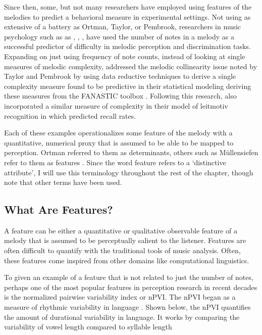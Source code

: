 \documentclass[]{book}
\begin{document}
Since then, some, but not many researchers have employed using features of the melodies to predict a behavioral measure in experimental settings.
Not using as extensive of a battery as Ortman, Taylor, or Pembrook, researchers in music psychology such as as \citet{akiva-kabiriMemoryTonalPitches2009}, \citet{dewittRecognitionNovelMelodies1986}, \citet{eerolaExpectancySamiYoiks2009}, \citet{schulzeWorkingMemorySpeech2012a} have used the number of notes in a melody as a successful predictor of difficulty in melodic perception and discrimination tasks.
Expanding on just using frequency of note counts, \citet{harrisonModellingMelodicDiscrimination2016} instead of looking at single measures of melodic complexity, addressed the melodic collinearity issue noted by Taylor and Pembrook by using data reductive techniques to derive a single complexity measure found to be predictive in their statistical modeling deriving these measures from the FANASTIC toolbox \citep{mullensiefenFantasticFeatureANalysis2009}.
Following this research, \citet{bakerPerceptionLeitmotivesRichard2017} also incorporated a similar measure of complexity in their model of leitmotiv recognition in which predicted recall rates.

Each of these examples operationalizes some feature of the melody with a quantitative, numerical proxy that is assumed to be able to be mapped to perception.
Ortman referred to them as determinants, others such as Müllensiefen refer to them as features \citep{mullensiefenFantasticFeatureANalysis2009}.
Since the word feature refers to a `distinctive attribute', I will use this terminology throughout the rest of the chapter, though note that other terms have been used.

\hypertarget{what-are-features}{%
\subsection{What Are Features?}\label{what-are-features}}

A feature can be either a quantitative or qualitative observable feature of a melody that is assumed to be perceptually salient to the listener.
Features are often difficult to quantify with the traditional tools of music analysis.
Often, these features come inspired from other domains like computational linguistics.

To given an example of a feature that is not related to just the number of notes, perhaps one of the most popular features in perception research in recent decades is the normalized pairwise variability index or nPVI.
The nPVI began as a measure of rhythmic variability in language \citep{grabeDurationalVariabilitySpeech2002}.
Shown below, the nPVI quantifies the amount of durational variability in language.
It works by comparing the variability of vowel length compared to syllable length
\end{document}

